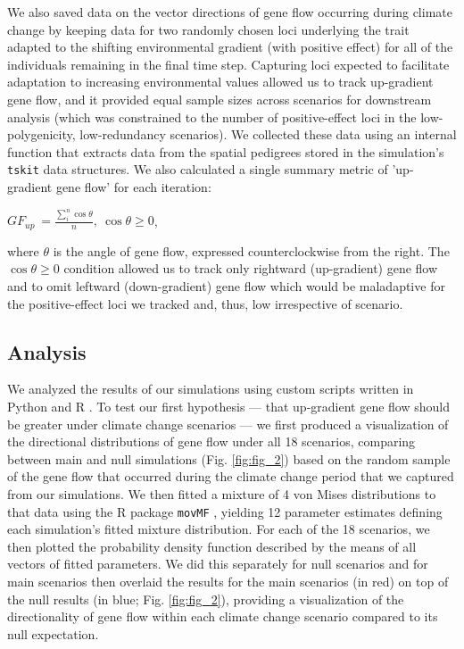 \documentclass[9pt,twocolumn,twoside,lineno]{new_article}
\begin{document}
We also saved data on the vector directions
of gene flow occurring during climate change by keeping 
data for two randomly chosen loci underlying the trait adapted to the shifting environmental gradient (with positive effect) for all of the individuals remaining in the final time step.
Capturing loci expected to facilitate 
adaptation to increasing environmental values allowed us to track up-gradient gene flow, and it  provided equal sample sizes across scenarios for downstream analysis (which was 
constrained to the number of positive-effect loci in
the low-polygenicity, low-redundancy scenarios). 
We collected these data using an internal function
that extracts data from the spatial pedigrees stored in the
simulation's \texttt{tskit} \cite{kelleher} data structures.
We also calculated a single summary metric of 'up-gradient gene flow' for each iteration:

$GF_{up}\ = \frac{\sum\limits_{i}^{n}\cos\theta}{n},\ \cos\theta\geq0$,

where $\theta$ is the angle of gene flow, expressed counterclockwise from the right.
The $\cos\theta\geq0$ condition allowed us to track only rightward (up-gradient) gene flow
and to omit leftward (down-gradient) gene flow which would be maladaptive for
the positive-effect loci we tracked and, thus, low irrespective of scenario.


\subsection*{Analysis}

We analyzed the results of our simulations using custom scripts written in 
Python \cite{rossum} and R \cite{r_core_team}. To test our first hypothesis --- that up-gradient gene flow should be greater under climate change scenarios --- we first produced a visualization of the directional 
distributions of gene flow under all 18 scenarios, comparing between main
and null simulations (Fig. \ref{fig:fig_2}) based on the random 
sample of the gene flow that occurred during the climate change period that we captured from our simulations. We then fitted a mixture of 4 von Mises distributions to that data
using the R package \texttt{movMF} \cite{hornik},
yielding 12 parameter estimates defining each simulation's fitted mixture distribution. For each of 
the 18 scenarios, we then plotted the probability density function 
described by the means of all vectors of fitted parameters. We did this 
separately for null scenarios and for main scenarios then overlaid the results for the main scenarios (in red)
on top of the null results (in blue; Fig. \ref{fig:fig_2}), providing a visualization of the directionality of gene flow within each 
climate change scenario compared to its null expectation.
\end{document}
